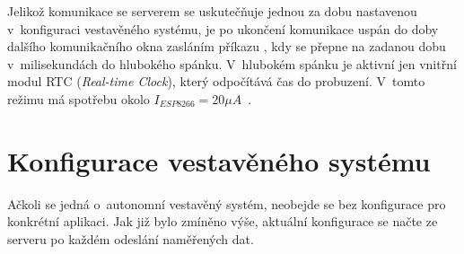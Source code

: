             Jelikož komunikace se serverem se uskutečňuje jednou za dobu nastavenou v~konfiguraci vestavěného systému, je  po ukončení komunikace uspán do doby dalšího komunikačního okna zasláním příkazu , kdy se přepne  na zadanou dobu v~milisekundách do hlubokého spánku. V~hlubokém spánku je aktivní jen vnitřní modul RTC (\textit{Real-time Clock}), který odpočítává čas do probuzení. V~tomto režimu má  spotřebu okolo $I_{ESP8266}=20\unit{\mu A}$~\cite{esp:lpwr}.

    \section{Konfigurace vestavěného systému}
        \label{sec:cfg}
        Ačkoli se jedná o~autonomní vestavěný systém, neobejde se bez konfigurace pro konkrétní aplikaci. Jak již bylo zmíněno výše, aktuální konfigurace se načte ze serveru po každém odeslání naměřených dat. 

